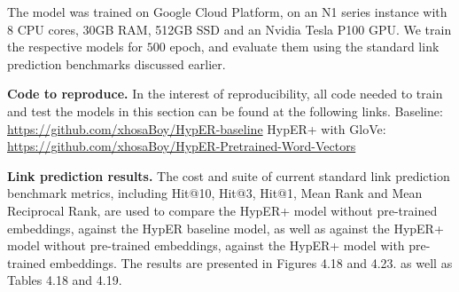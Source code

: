 
\noindent The model was trained on Google Cloud Platform, on an N1 series instance with  8 CPU cores, 30GB RAM, 512GB SSD and an Nvidia Tesla P100 GPU. We train the respective models for $ 500 $ epoch, and evaluate them using the standard link prediction benchmarks discussed earlier. \par 

\noindent \textbf{Code to reproduce.} In the interest of reproducibility, all code needed to train and test the models in this section can be found at the following links. \newline
Baseline: \url{https://github.com/xhosaBoy/HypER-baseline} \newline
HypER+ with GloVe: \url{https://github.com/xhosaBoy/HypER-Pretrained-Word-Vectors} \par

\noindent \textbf{Link prediction results.} The cost and suite of current standard link prediction benchmark metrics, including Hit@10, Hit@3, Hit@1, Mean Rank and Mean Reciprocal Rank, are used to compare the HypER+ model without pre-trained embeddings, against the HypER baseline model, as well as against the HypER+ model without pre-trained embeddings, against the HypER+ model with pre-trained embeddings. The results are presented in Figures 4.18 and 4.23. as well as Tables 4.18 and 4.19. \par


\bigskip

